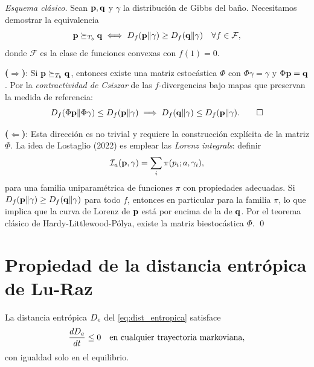 \begin{proof}[Esquema clásico]
Sean $\vb{p}, \vb{q}$ y $\gamma$ la distribución de Gibbs del baño. Necesitamos 
demostrar la equivalencia
\begin{equation}
    \vb{p} \succeq_{T_{b}} \vb{q} \iff D_f(\vb{p} \| \gamma) \geq D_f(\vb{q} \| \gamma) 
    \quad \forall f \in \mathcal{F},
\end{equation}
%
donde $\mathcal{F}$ es la clase de funciones convexas con $f(1) = 0$.

\textbf{(}$\Rightarrow$\textbf{)}: Si $\vb{p} \succeq_{T_{b}} \vb{q}$, entonces 
existe una matriz estocástica $\Phi$ con $\Phi \gamma = \gamma$ y 
$\Phi \vb{p} = \vb{q}$. Por la \emph{contractividad de Csiszar} de las 
$f$-divergencias bajo mapas que preservan la medida de referencia:
\begin{equation}
    D_f(\Phi \vb{p} \| \Phi \gamma) \leq D_f(\vb{p} \| \gamma) 
    \implies D_f(\vb{q} \| \gamma) \leq D_f(\vb{p} \| \gamma). \qed
\end{equation}

\textbf{(}$\Leftarrow$\textbf{)}: Esta dirección es no trivial y requiere la 
construcción explícita de la matriz $\Phi$. La idea de Lostaglio (2022) es 
emplear las \emph{Lorenz integrals}: definir
\begin{equation}
    \mathcal{I}_a(\vb{p}, \gamma) = \sum_i \pi(p_i; a, \gamma_i),
\end{equation}
%
para una familia uniparamétrica de funciones $\pi$ con propiedades adecuadas. 
Si $D_f(\vb{p} \| \gamma) \geq D_f(\vb{q} \| \gamma)$ para todo $f$, entonces en 
particular para la familia $\pi$, lo que implica que la curva de Lorenz de 
$\vb{p}$ está por encima de la de $\vb{q}$. Por el teorema clásico de 
Hardy-Littlewood-Pólya, existe la matriz biestocástica $\Phi$. \qed
\end{proof}

\section{Propiedad de la distancia entrópica de Lu-Raz}

\begin{proposition}
La distancia entrópica $D_{e}$ del \cref{eq:dist_entropica} satisface
\begin{equation}
    \frac{d D_{e}}{dt} \leq 0 \quad \text{en cualquier trayectoria markoviana},
\end{equation}
con igualdad solo en el equilibrio.
\end{proposition}

